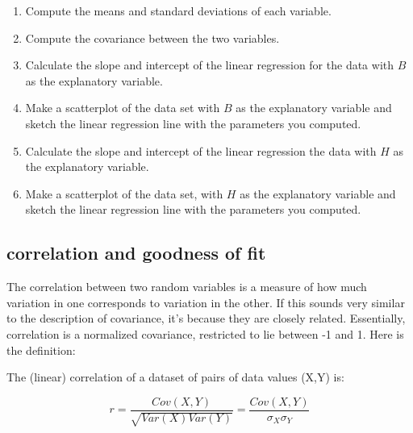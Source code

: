\documentclass[
  letterpaper,
  DIV=11,
  numbers=noendperiod]{scrreprt}
\begin{document}
\begin{enumerate}
\def\labelenumi{\arabic{enumi}.}
\item
  Compute the means and standard deviations of each variable.
\item
  Compute the covariance between the two variables.
\item
  Calculate the slope and intercept of the linear regression for the
  data with \(B\) as the explanatory variable.
\item
  Make a scatterplot of the data set with \(B\) as the explanatory
  variable and sketch the linear regression line with the parameters you
  computed.
\item
  Calculate the slope and intercept of the linear regression the data
  with \(H\) as the explanatory variable.
\item
  Make a scatterplot of the data set, with \(H\) as the explanatory
  variable and sketch the linear regression line with the parameters you
  computed.
\end{enumerate}

\hypertarget{correlation-and-goodness-of-fit}{%
\subsection{correlation and goodness of
fit}\label{correlation-and-goodness-of-fit}}

The correlation between two random variables is a measure of how much
variation in one corresponds to variation in the other. If this sounds
very similar to the description of covariance, it's because they are
closely related. Essentially, correlation is a normalized covariance,
restricted to lie between -1 and 1. Here is the definition:

\begin{tcolorbox}[enhanced jigsaw, coltitle=black, arc=.35mm, opacitybacktitle=0.6, breakable, bottomtitle=1mm, toptitle=1mm, titlerule=0mm, colback=white, leftrule=.75mm, rightrule=.15mm, colframe=quarto-callout-note-color-frame, colbacktitle=quarto-callout-note-color!10!white, opacityback=0, title=\textcolor{quarto-callout-note-color}{\faInfo}\hspace{0.5em}{Definition}, left=2mm, toprule=.15mm, bottomrule=.15mm]

The  (linear) correlation of a dataset of pairs of
data values (X,Y) is:

\end{tcolorbox}

\[ r = \frac{Cov(X,Y)}{\sqrt{{Var(X)}{Var(Y)}}} =  \frac{Cov(X,Y)}{\sigma_X \sigma_Y}
\]
\end{document}
